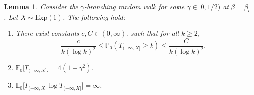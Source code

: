 \documentclass[a4paper, a4wide, 10pt, reqno]{amsart}
\theoremstyle{plain}
\newtheorem{lemma}[theorem]{Lemma}
\theoremstyle{definition}
\numberwithin{equation}{section}
\newcommand{\E}{\mathbb E}
\newcommand{\Prob}{\mathbb{P}}
\begin{document}
\begin{lemma}\label{lem:local-lim-progeny}
    Consider the $\gamma$-branching random walk for some $\gamma\in[0, 1/2)$ at $\beta=\beta_c$. Let $X\sim \mathrm{Exp}(1)$. The following hold:
    \begin{enumerate}
        \item There exist constants $c,C\in(0,\infty)$, such that for all $k\ge 2$,
        \[
        \frac{c}{k(\log k)^2} \le \Prob_{0}(T_{(-\infty,X]} \ge k) \le \frac{C}{k(\log k)^2}.
        \]
        \item $\E_{0}\big[T_{(-\infty, X]}\big]=4(1-\gamma^2)$.
        \item $\E_{0}\big[T_{(-\infty, X]}\log T_{(-\infty, X]}\big]=\infty$.
    \end{enumerate}
\end{lemma}
\end{document}
